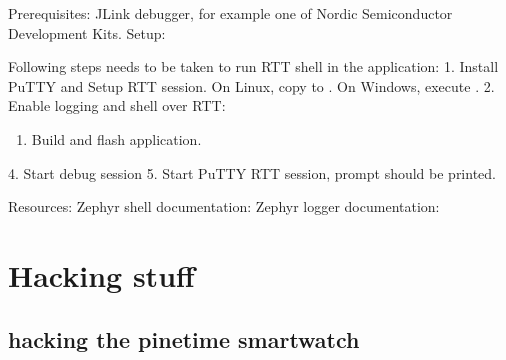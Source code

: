 \documentclass[letterpaper,10pt,english]{sphinxmanual}
\begin{document}
Prerequisites:
\sphinxhyphen{} JLink debugger, for example one of Nordic Semiconductor Development Kits.
\sphinxhyphen{} Setup: 

Following steps needs to be taken to run RTT shell in the application:
1. Install PuTTY and Setup RTT session. On Linux, copy  to . On Windows,
execute .
2. Enable logging and shell over RTT:
\begin{enumerate}
%
\setcounter{enumi}{2}
\item {} 
Build and flash application.

\end{enumerate}

4. Start debug session
5. Start PuTTY RTT session, prompt should be printed.

Resources:
\sphinxhyphen{} Zephyr shell documentation: 
\sphinxhyphen{} Zephyr logger documentation: 


\chapter{Hacking stuff}
\label{\detokenize{hacking/hacking:hacking-stuff}}\label{\detokenize{hacking/hacking:hacking}}\label{\detokenize{hacking/hacking::doc}}

\section{hacking   the pinetime smartwatch}
\label{\detokenize{hacking/flashing:hacking-the-pinetime-smartwatch}}\label{\detokenize{hacking/flashing::doc}}
\begin{sphinxVerbatim}[commandchars=\\\{\}]
     
        
\end{sphinxVerbatim}
\end{document}
